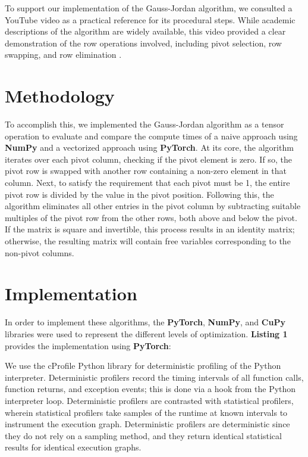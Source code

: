 \documentclass[12pt]{article}
\begin{document}
To support our implementation of the Gauss-Jordan algorithm, we consulted a YouTube video as a practical reference for its procedural steps. While academic descriptions of the algorithm are widely available, this video provided a clear demonstration of the row operations involved, including pivot selection, row swapping, and row elimination \cite{gaussjordan_video}.

\section{Methodology}

To accomplish this, we implemented the Gauss-Jordan algorithm as a tensor operation to evaluate and compare the compute times of a naive approach using \textbf{NumPy} and a vectorized approach using \textbf{PyTorch}. At its core, the algorithm iterates over each pivot column, checking if the pivot element is zero. If so, the pivot row is swapped with another row containing a non-zero element in that column. Next, to satisfy the requirement that each pivot must be 1, the entire pivot row is divided by the value in the pivot position. Following this, the algorithm eliminates all other entries in the pivot column by subtracting suitable multiples of the pivot row from the other rows, both above and below the pivot. If the matrix is square and invertible, this process results in an identity matrix; otherwise, the resulting matrix will contain free variables corresponding to the non-pivot columns.

\section{Implementation}

In order to implement these algorithms, the \textbf{PyTorch}, \textbf{NumPy}, and \textbf{CuPy} libraries were used to represent the different levels of optimization. \textbf{Listing 1} provides the implementation using \textbf{PyTorch}:
\hfill\break

\lstset{style=mystyle}


We use the cProfile Python library for deterministic profiling of the Python interpreter. Deterministic profilers record the timing intervals of all function calls, function returns, and exception events; this is done via a hook from the Python interpreter loop. Deterministic profilers are contrasted with statistical profilers, wherein statistical profilers take samples of the runtime at known intervals to instrument the execution graph. Deterministic profilers are deterministic since they do not rely on a sampling method, and they return identical statistical results for identical execution graphs. 
\end{document}
